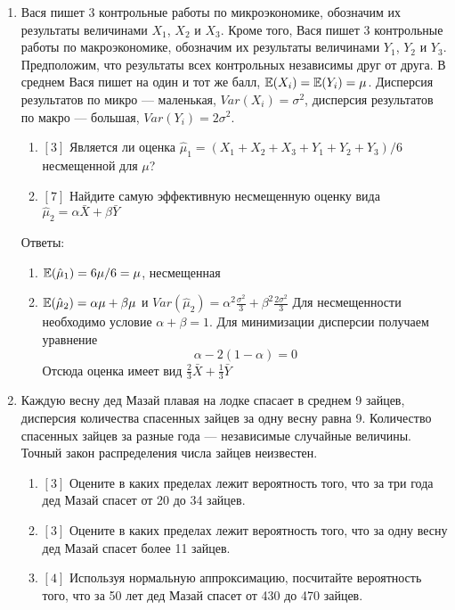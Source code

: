 \documentclass[pdftex,12pt,a4paper]{article}
\begin{document}
\begin{enumerate}
\item Вася пишет 3 контрольные работы по микроэкономике, обозначим их результаты величинами $X_1$, $X_2$ и $X_3$. Кроме того, Вася пишет 3 контрольные работы по макроэкономике, обозначим их результаты величинами $Y_1$, $Y_2$ и $Y_3$. Предположим, что результаты всех контрольных независимы друг от друга. В среднем Вася пишет на один и тот же балл, $\mathbb{E}(X_i)=\mathbb{E}(Y_i)=\mu$. Дисперсия результатов по микро --- маленькая, $Var(X_i)=\sigma^2$, дисперсия результатов по макро --- большая, $Var(Y_i)=2\sigma^2$.
\begin{enumerate}
\item $[3]$ Является ли оценка $\hat{\mu}_1=(X_1+X_2+X_3+Y_1+Y_2+Y_3)/6$ несмещенной для $\mu$?
\item $[7]$ Найдите самую эффективную несмещенную оценку вида $\hat{\mu}_2=\alpha \bar{X}+\beta \bar{Y}$
\end{enumerate}

Ответы:
\begin{enumerate}
\item $\mathbb{E}(\hat{\mu}_1)=6\mu/6=\mu$, несмещенная
\item $\mathbb{E}(\hat{\mu}_2)=\alpha \mu+\beta \mu$ и $Var(\hat{\mu}_2)=\alpha^2 \frac{\sigma^2}{3}+\beta^2 \frac{2\sigma^2}{3}$
Для несмещенности необходимо условие $\alpha+\beta=1$. Для минимизации дисперсии получаем уравнение
\begin{equation}
\alpha-2(1-\alpha)=0
\end{equation}
Отсюда оценка имеет вид $\frac{2}{3}\bar{X}+\frac{1}{3}\bar{Y}$
\end{enumerate}


\item Каждую весну дед Мазай плавая на лодке спасает в среднем 9 зайцев, дисперсия количества спасенных зайцев за одну весну равна 9. Количество спасенных зайцев за разные года --- независимые случайные величины. Точный закон распределения числа зайцев неизвестен. 
\begin{enumerate}
\item $[3]$ Оцените в каких пределах лежит вероятность того, что за три года дед Мазай спасет от 20 до 34 зайцев.
\item $[3]$ Оцените в каких пределах лежит вероятность того, что за одну весну дед Мазай спасет более 11 зайцев.
\item $[4]$ Используя нормальную аппроксимацию, посчитайте вероятность того, что за 50 лет дед Мазай спасет от 430 до 470 зайцев.
\end{enumerate}


\end{enumerate}
\end{document}
